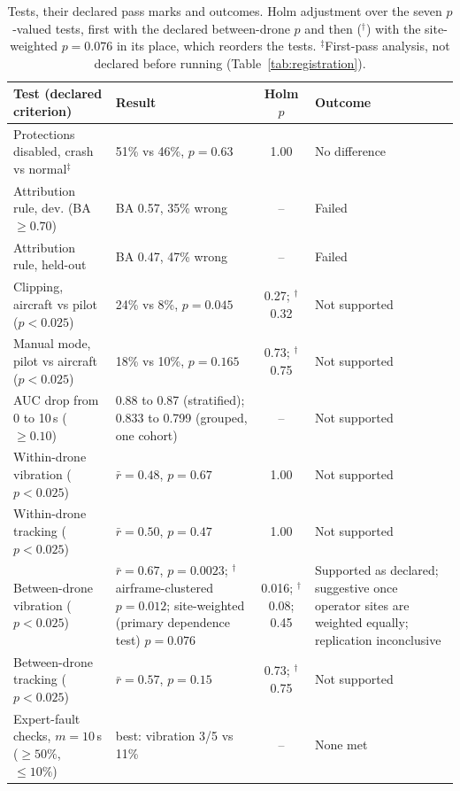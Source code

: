 \documentclass[preprint,12pt]{elsarticle}
\begin{document}
\begin{table}[t]
\centering
\caption{Tests, their declared pass marks and outcomes. Holm adjustment over the seven $p$-valued tests, first with the declared between-drone $p$ and then ($^\dagger$) with the site-weighted $p=0.076$ in its place, which reorders the tests. $^\ddagger$First-pass analysis, not declared before running (Table~\ref{tab:registration}).}
\label{tab:tests}
\small
\begin{tabularx}{\textwidth}{@{}p{}p{}cY@{}}
\toprule
Test (declared criterion) & Result & Holm $p$ & Outcome \\
\midrule
Protections disabled, crash vs normal$^\ddagger$ & 51\% vs 46\%, $p=0.63$ & 1.00 & No difference \\
Attribution rule, dev. (BA $\geq 0.70$) & BA 0.57, 35\% wrong & -- & Failed \\
Attribution rule, held-out & BA 0.47, 47\% wrong & -- & Failed \\
Clipping, aircraft vs pilot ($p<0.025$) & 24\% vs 8\%, $p=0.045$ & 0.27; $^\dagger$0.32 & Not supported \\
Manual mode, pilot vs aircraft ($p<0.025$) & 18\% vs 10\%, $p=0.165$ & 0.73; $^\dagger$0.75 & Not supported \\
AUC drop from 0 to 10\,s ($\geq 0.10$) & 0.88 to 0.87 (stratified); 0.833 to 0.799 (grouped, one cohort) & -- & Not supported \\
Within-drone vibration ($p<0.025$) & $\bar r=0.48$, $p=0.67$ & 1.00 & Not supported \\
Within-drone tracking ($p<0.025$) & $\bar r=0.50$, $p=0.47$ & 1.00 & Not supported \\
Between-drone vibration ($p<0.025$) & $\bar r=0.67$, $p=0.0023$; $^\dagger$airframe-clustered $p=0.012$; site-weighted (primary dependence test) $p=0.076$ & 0.016; $^\dagger$0.08; 0.45 & Supported as declared; suggestive once operator sites are weighted equally; replication inconclusive \\
Between-drone tracking ($p<0.025$) & $\bar r=0.57$, $p=0.15$ & 0.73; $^\dagger$0.75 & Not supported \\
Expert-fault checks, $m=10$\,s ($\geq 50\%$, $\leq 10\%$) & best: vibration 3/5 vs 11\% & -- & None met \\
\bottomrule
\end{tabularx}
\end{table}

\FloatBarrier
\end{document}
